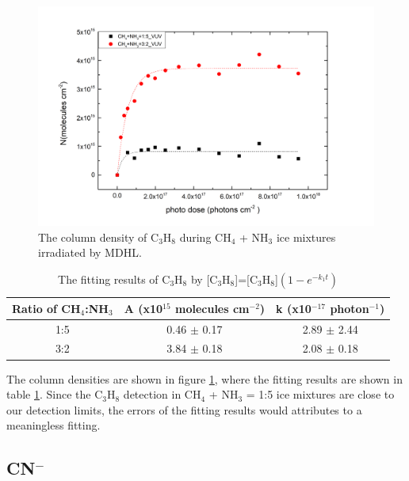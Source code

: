 \begin{figure}
\centering
\includegraphics[width=\textwidth]{figures/chapter3/VUV_C3H8.png}
\caption{The column density of C$_3$H$_8$ during CH$_4$ + NH$_3$ ice mixtures irradiated by MDHL. }
\label{fig:lab_C3H8}
\end{figure}

\begin{table}[htbp]
\caption{The fitting results of C$_3$H$_8$ by [C$_3$H$_8$]=[C$_3$H$_8$]$(1 - e^{-k_1 t})$}
\label{tab:fittingC3H8}
\begin{tabular}{ccc}
\hline
\hline
Ratio of CH$_4$:NH$_3$ & A (x10$^{15}$ molecules cm$^{-2}$) & k (x10$^{-17}$ photon$^{-1}$) \\
\hline
1:5 & 0.46 $\pm$ 0.17 & 2.89 $\pm$ 2.44 \\
3:2 & 3.84 $\pm$ 0.18 & 2.08 $\pm$ 0.18 \\
\hline
\end{tabular}
\end{table}

The column densities are shown in figure \ref{fig:lab_C3H8}, where the fitting results are shown in table \ref{tab:fittingC3H8}. Since the C$_3$H$_8$ detection in CH$_4$ + NH$_3$ = 1:5 ice mixtures are close to our detection limits, the errors of the fitting results would attributes to a meaningless fitting.


\subsection{CN$^-$}


